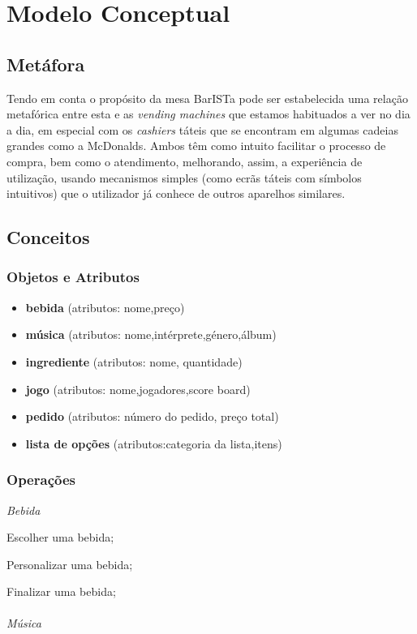 \documentclass{article}
\begin{document}
\section*{Modelo Conceptual}



\subsection*{Metáfora}
 Tendo em conta o propósito da mesa BarISTa pode ser estabelecida uma relação metafórica entre esta e as \textit{vending machines} que estamos habituados a ver no dia a dia, em especial com os \textit{cashiers} táteis que se encontram em algumas cadeias grandes como a McDonalds. Ambos têm como intuito facilitar o processo de compra, bem como o atendimento, melhorando, assim, a experiência de utilização, usando mecanismos simples (como ecrãs táteis com símbolos intuitivos) que o utilizador já conhece de outros aparelhos similares.

\subsection*{Conceitos}
\subsubsection*{Objetos e Atributos}
\begin{itemize}
\item\textbf{bebida} (atributos: nome,preço)
\item\textbf{música} (atributos: nome,intérprete,género,álbum)
\item\textbf{ingrediente} (atributos: nome, quantidade)
\item\textbf{jogo} (atributos: nome,jogadores,score board)
\item\textbf{pedido} (atributos: número do pedido, preço total)
\item\textbf{lista de opções} (atributos:categoria da lista,itens)
\end{itemize}

\subsubsection*{Operações}
\textit{Bebida}

Escolher uma bebida;

Personalizar uma bebida;

Finalizar uma bebida;\\\\	
\textit{Música}
\end{document}
